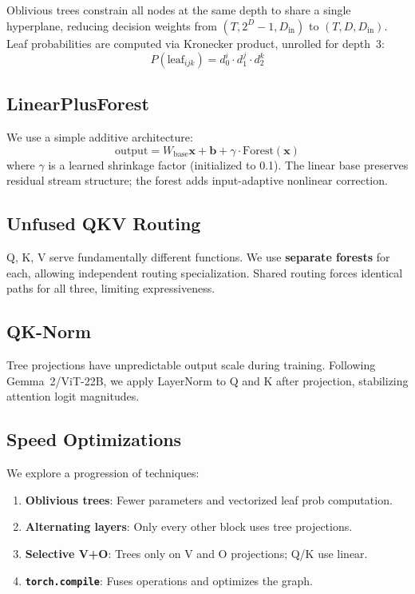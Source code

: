 \documentclass[11pt,a4paper]{article}
\begin{document}
Oblivious trees constrain all nodes at the same depth to share a single hyperplane, reducing decision weights from $(T, 2^D\!-\!1, D_{\text{in}})$ to $(T, D, D_{\text{in}})$. Leaf probabilities are computed via Kronecker product, unrolled for depth~3:
\begin{equation}
    P(\text{leaf}_{ijk}) = d_0^i \cdot d_1^j \cdot d_2^k
\end{equation}

\subsection{LinearPlusForest}

We use a simple additive architecture:
\begin{equation}
    \text{output} = W_{\text{base}} \mathbf{x} + \mathbf{b} + \gamma \cdot \text{Forest}(\mathbf{x})
\end{equation}
where $\gamma$ is a learned shrinkage factor (initialized to 0.1). The linear base preserves residual stream structure; the forest adds input-adaptive nonlinear correction.

\subsection{Unfused QKV Routing}

Q, K, V serve fundamentally different functions. We use \textbf{separate forests} for each, allowing independent routing specialization. Shared routing forces identical paths for all three, limiting expressiveness.

\subsection{QK-Norm}

Tree projections have unpredictable output scale during training. Following Gemma~2/ViT-22B, we apply LayerNorm to Q and K after projection, stabilizing attention logit magnitudes.

\subsection{Speed Optimizations}

We explore a progression of techniques:
\begin{enumerate}
    \item \textbf{Oblivious trees}: Fewer parameters and vectorized leaf prob computation.
    \item \textbf{Alternating layers}: Only every other block uses tree projections.
    \item \textbf{Selective V+O}: Trees only on V and O projections; Q/K use linear.
    \item \textbf{\texttt{torch.compile}}: Fuses operations and optimizes the graph.
\end{enumerate}
\end{document}
